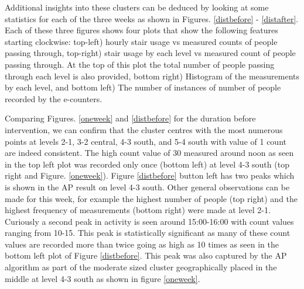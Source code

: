  
Additional insights into these clusters can be deduced by looking at some statistics for each of the three weeks as shown in Figures. \ref{distbefore} - \ref{distafter}. Each of these three figures shows four plots that show the following features starting clockwise: top-left) hourly stair usage vs measured counts of people passing through, top-right) stair usage by each level vs measured count of people passing through. At the top of this plot the total number of people passing through each level is also provided, bottom right) Histogram of the measurements by each level, and bottom left) The number of instances of number of people recorded by the e-counters.


Comparing Figures. \ref{oneweek} and \ref{distbefore} for the duration before intervention, we can confirm that the cluster centres with the most numerous points at levels 2-1, 3-2 central, 4-3 south, and 5-4 south with value of 1 count are indeed consistent. The high count value of 30 measured around noon as seen in the top left plot was recorded only once (bottom left) at level 4-3 south (top right and Figure. \ref{oneweek}). Figure \ref{distbefore} button left has two peaks which is shown in the AP result on level 4-3 south. Other general observations can be made for this week, for example the highest number of people (top right) and the highest frequency of measurements (bottom right) were made at level 2-1. Curiously a second peak in activity is seen around 15:00-16:00 with count values ranging from 10-15. This peak is statistically significant as many of these count values are recorded more than twice going as high as 10 times as seen in the bottom left plot of Figure \ref{distbefore}. This peak was also captured by the AP algorithm as part of the moderate sized cluster geographically placed in the middle at level 4-3 south as shown in figure \ref{oneweek}.
